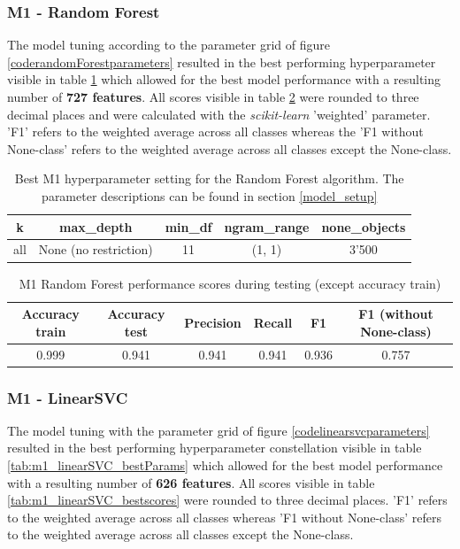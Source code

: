 \subsubsection{M1 - Random Forest}
The model tuning according to the parameter grid of figure \ref{coderandomForestparameters} resulted in the best performing hyperparameter visible in table \ref{tab:m1_randomForest_bestParams} which allowed for the best model performance with a resulting number of \textbf{727 features}. All scores visible in table \ref{tab:m1_randomForest_bestscores} were rounded to three decimal places and were calculated with the \textit{scikit-learn} 'weighted' parameter. 'F1' refers to the weighted average across all classes whereas the 'F1 without None-class' refers to the weighted average across all classes except the None-class.

\begin{table}[h!]
\begin{center}
\caption{Best M1 hyperparameter setting for the Random Forest algorithm. The parameter descriptions can be found in section \ref{model_setup}}\vspace{1ex}
\label{tab:m1_randomForest_bestParams}
\begin{tabular}{ccccc}\hline
k & max\_depth & min\_df & ngram\_range & none\_objects \\ \hline
all & None (no restriction) & 11 & (1, 1) & 3'500 \\ \hline
\end{tabular}
\end{center}
\end{table}

\begin{table}[h!]
\begin{center}
\caption{M1 Random Forest performance scores during testing (except accuracy train)}\vspace{1ex}
\label{tab:m1_randomForest_bestscores}
\begin{tabular}{cccccc}\hline
Accuracy train & Accuracy test & Precision & Recall & F1 & F1 (without None-class)\\ \hline
0.999 & 0.941 & 0.941 & 0.941 & 0.936 & 0.757 \\ \hline
\end{tabular}
\end{center}
\end{table}

\subsubsection{M1 - LinearSVC}
The model tuning with the parameter grid of figure \ref{codelinearsvcparameters} resulted in the best performing hyperparameter constellation visible in table \ref{tab:m1_linearSVC_bestParams} which allowed for the best model performance with a resulting number of \textbf{626 features}. All scores visible in table \ref{tab:m1_linearSVC_bestscores} were rounded to three decimal places. 'F1' refers to the weighted average across all classes whereas 'F1 without None-class' refers to the weighted average across all classes except the None-class.

